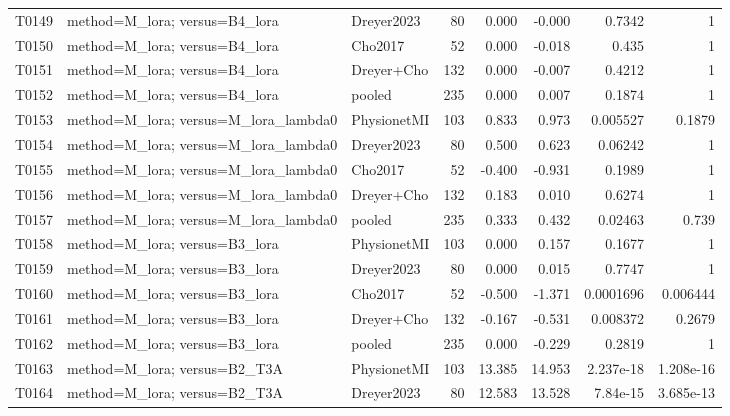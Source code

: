 \begin{longtable}{p{.45in}p{2.6in}p{.75in}rrrrr}
T0149 & method=M\_\allowbreak{}lora; versus=B4\_\allowbreak{}lora & Dreyer2023 & 80 & 0.000 & -0.000 & 0.7342 & 1 \\
T0150 & method=M\_\allowbreak{}lora; versus=B4\_\allowbreak{}lora & Cho2017 & 52 & 0.000 & -0.018 & 0.435 & 1 \\
T0151 & method=M\_\allowbreak{}lora; versus=B4\_\allowbreak{}lora & Dreyer+Cho & 132 & 0.000 & -0.007 & 0.4212 & 1 \\
T0152 & method=M\_\allowbreak{}lora; versus=B4\_\allowbreak{}lora & pooled & 235 & 0.000 & 0.007 & 0.1874 & 1 \\
T0153 & method=M\_\allowbreak{}lora; versus=M\_\allowbreak{}lora\_\allowbreak{}lambda0 & PhysionetMI & 103 & 0.833 & 0.973 & 0.005527 & 0.1879 \\
T0154 & method=M\_\allowbreak{}lora; versus=M\_\allowbreak{}lora\_\allowbreak{}lambda0 & Dreyer2023 & 80 & 0.500 & 0.623 & 0.06242 & 1 \\
T0155 & method=M\_\allowbreak{}lora; versus=M\_\allowbreak{}lora\_\allowbreak{}lambda0 & Cho2017 & 52 & -0.400 & -0.931 & 0.1989 & 1 \\
T0156 & method=M\_\allowbreak{}lora; versus=M\_\allowbreak{}lora\_\allowbreak{}lambda0 & Dreyer+Cho & 132 & 0.183 & 0.010 & 0.6274 & 1 \\
T0157 & method=M\_\allowbreak{}lora; versus=M\_\allowbreak{}lora\_\allowbreak{}lambda0 & pooled & 235 & 0.333 & 0.432 & 0.02463 & 0.739 \\
T0158 & method=M\_\allowbreak{}lora; versus=B3\_\allowbreak{}lora & PhysionetMI & 103 & 0.000 & 0.157 & 0.1677 & 1 \\
T0159 & method=M\_\allowbreak{}lora; versus=B3\_\allowbreak{}lora & Dreyer2023 & 80 & 0.000 & 0.015 & 0.7747 & 1 \\
T0160 & method=M\_\allowbreak{}lora; versus=B3\_\allowbreak{}lora & Cho2017 & 52 & -0.500 & -1.371 & 0.0001696 & 0.006444 \\
T0161 & method=M\_\allowbreak{}lora; versus=B3\_\allowbreak{}lora & Dreyer+Cho & 132 & -0.167 & -0.531 & 0.008372 & 0.2679 \\
T0162 & method=M\_\allowbreak{}lora; versus=B3\_\allowbreak{}lora & pooled & 235 & 0.000 & -0.229 & 0.2819 & 1 \\
T0163 & method=M\_\allowbreak{}lora; versus=B2\_\allowbreak{}T3A & PhysionetMI & 103 & 13.385 & 14.953 & 2.237e-18 & 1.208e-16 \\
T0164 & method=M\_\allowbreak{}lora; versus=B2\_\allowbreak{}T3A & Dreyer2023 & 80 & 12.583 & 13.528 & 7.84e-15 & 3.685e-13 \\

\end{longtable}
